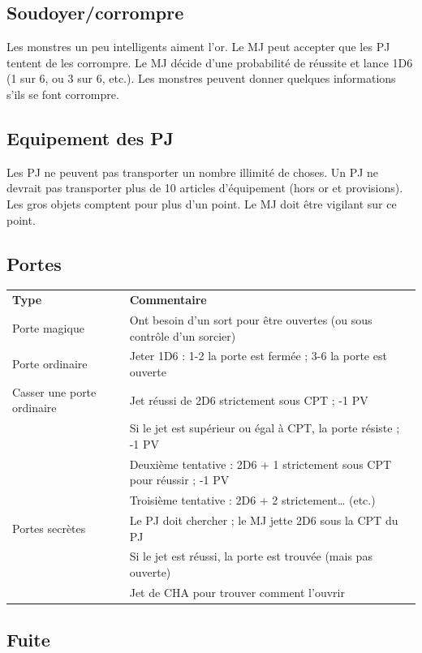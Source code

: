 \documentclass[a4paper, 11pt, twoside]{article}
\begin{document}
\subsection{Soudoyer/corrompre}
\label{sec:org694b2ce}

Les monstres un peu intelligents aiment l'or. Le MJ peut accepter que les PJ tentent de les corrompre. Le MJ décide d'une probabilité de réussite et lance 1D6 (1 sur 6, ou 3 sur 6, etc.). Les monstres peuvent donner quelques informations s'ils se font corrompre.

\subsection{Equipement des PJ}
\label{sec:org8504ec4}

Les PJ ne peuvent pas transporter un nombre illimité de choses. Un PJ ne devrait pas transporter plus de 10 articles d'équipement (hors or et provisions). Les gros objets comptent pour plus d'un point. Le MJ doit être vigilant sur ce point.

\subsection{Portes}
\label{sec:org7ab7de3}

\begin{longtable}{ll}
\textbf{Type} & \textbf{Commentaire}\\
Porte magique & Ont besoin d'un sort pour être ouvertes (ou sous contrôle d'un sorcier)\\
Porte ordinaire & Jeter 1D6 : 1-2 la porte est fermée ; 3-6 la porte est ouverte\\
Casser une porte ordinaire & Jet réussi de 2D6 strictement sous CPT ; -1 PV\\
 & Si le jet est supérieur ou égal à CPT, la porte résiste ; -1 PV\\
 & Deuxième tentative : 2D6 + 1 strictement sous CPT pour réussir ; -1 PV\\
 & Troisième tentative : 2D6 + 2 strictement\ldots{} (etc.)\\
Portes secrètes & Le PJ doit chercher ; le MJ jette 2D6 sous la CPT du PJ\\
 & Si le jet est réussi, la porte est trouvée (mais pas ouverte)\\
 & Jet de CHA pour trouver comment l'ouvrir\\
\end{longtable}

\subsection{Fuite}
\label{sec:org603f596}
\end{document}
